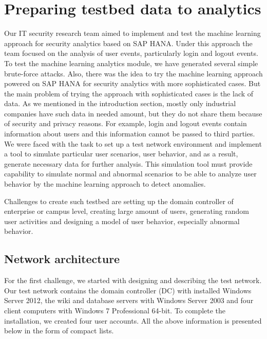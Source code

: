 \section{Preparing testbed data to analytics}
Our IT security research team aimed to implement and test the machine learning approach for security analytics based on SAP HANA. Under this approach the team focused on the analysis of user events, particularly login and logout events. To test the machine learning analytics module, we have generated several simple brute-force attacks. Also, there was the idea to try the machine learning approach powered on SAP HANA for security analytics with more sophisticated cases. But the main problem of trying the approach with sophisticated cases is the lack of data. As we mentioned in the introduction section, mostly only industrial companies have such data in needed amount, but they do not share them because of security and privacy reasons. For example, login and logout events contain information about users and this information cannot be passed to third parties. We were faced with the task to set up a test network environment and implement a tool to simulate particular user scenarios, user behavior, and as a result, generate necessary data for further analysis. This simulation tool must provide capability to simulate normal and abnormal scenarios to be able to analyze user behavior by the machine learning approach to detect anomalies.  

Challenges to create such testbed are setting up the domain controller of enterprise or campus level, creating large amount of users, generating random user activities and designing a model of user behavior, especially abnormal behavior.
  
\subsection{Network architecture}
For the first challenge, we started with designing and describing the test network. Our test network contains the domain controller (DC) with installed Windows Server 2012, the wiki and database servers with Windows Server 2003 and four client computers with Windows 7 Professional 64-bit. To complete the installation, we created four user accounts. All the above information is presented below in the form of compact lists.

